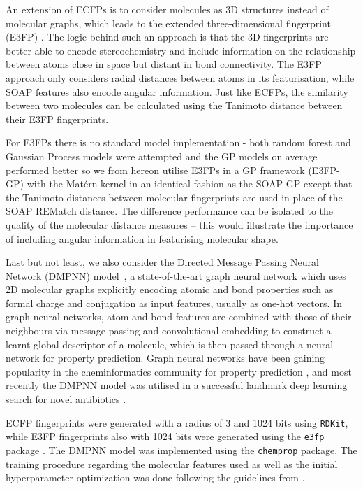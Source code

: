 An extension of ECFPs is to consider molecules as 3D structures instead of molecular graphs, which leads to the extended three-dimensional fingerprint (E3FP) \cite{Axen17e3fp}. The logic behind such an approach is that the 3D fingerprints are better able to encode stereochemistry and include information on the relationship between atoms close in space but distant in bond connectivity. The E3FP approach only considers radial distances between atoms in its featurisation, while SOAP features also encode angular information. Just like ECFPs, the similarity between two molecules can be calculated using the Tanimoto distance between their E3FP fingerprints.

For E3FPs there is no standard model implementation - both random forest and Gaussian Process models were attempted and the GP models on average performed better so we from hereon utilise E3FPs in a GP framework (E3FP-GP) with the Mat{\'e}rn kernel in an identical fashion as the SOAP-GP except that the Tanimoto distances between molecular fingerprints are used in place of the SOAP REMatch distance. The difference performance can be isolated to the quality of the molecular distance measures -- this would illustrate the importance of including angular information in featurising molecular shape.

Last but not least, we also consider the Directed Message Passing Neural Network (DMPNN) model~\cite{yang2019chemprop}, a state-of-the-art graph neural network which uses 2D molecular graphs explicitly encoding atomic and bond properties such as formal charge and conjugation as input features, usually as one-hot vectors. In graph neural networks, atom and bond features are combined with those of their neighbours via message-passing and convolutional embedding to construct a learnt global descriptor of a molecule, which is then passed through a neural network for property prediction. Graph neural networks have been gaining popularity in the cheminformatics community for property prediction \cite{Gilmer17mpnn, Feinberg18potentialnet}, and most recently the DMPNN model was utilised in a successful landmark deep learning search for novel antibiotics \cite{stokes2020antibiotic}. 

ECFP fingerprints were generated with a radius of 3 and 1024 bits using \texttt{RDKit}, while E3FP fingerprints also with 1024 bits were generated using the \texttt{e3fp} package \cite{Axen17e3fp}. The DMPNN model was implemented using the \texttt{chemprop} package. The training procedure regarding the molecular features used as well as the initial hyperparameter optimization was done following the guidelines from \cite{yang2019chemprop}.

